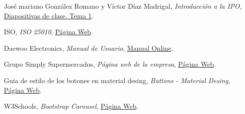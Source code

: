 \documentclass[a4paper,11pt]{article}
\begin{document}
\begin{thebibliography}{99}
  José mariano González Romano y Víctor Díaz Madrigal,
  \textit{Introducción a la IPO},
  \href{https://s3-eu-central-1.amazonaws.com/learn-eu-central-1-prod-fleet01-xythos/5ac734ed505df/1497177?response-content-disposition=inline%3B%20filename%2A%3DUTF-8%27%27IPO-2018-19-01-Introducci%25C3%25B3n%2520a%2520la%2520IPO.pdf&response-content-type=application%2Fpdf&X-Amz-Algorithm=AWS4-HMAC-SHA256&X-Amz-Date=20181009T201303Z&X-Amz-SignedHeaders=host&X-Amz-Expires=21600&X-Amz-Credential=AKIAIZ3QX2YUHH4EOO3A%2F20181009%2Feu-central-1%2Fs3%2Faws4_request&X-Amz-Signature=91e59768c9f86b77180953691bdcae19f7300073d4ad74d0949de1515d0b6f55}{Diapositivas de clase. Tema 1}.

ISO,
\textit{ISO 25010},
\href{https://iso25000.com/index.php/normas-iso-25000/iso-25010/23-usabilidad}{Página Web}.

Daewoo Electronics,
\textit{Manual de Usuario},
\href{http://www.daewooelectronics.co.uk/media/manual/KOG-6F2B_Manual.pdf}{Manual Online}.

Grupo Simply Supermercados,
\textit{Página web de la empresa},
\href{www.simply.es}{Página Web}.

Guia de estilo de los botones en material desing,
\textit{Buttons - Material Desing},
\href{https://material.io/design/components/buttons.html}{Página Web}.

W3Schools,
\textit{Bootstrap Carousel},
\href{https://www.w3schools.com/bootstrap/bootstrap_carousel.asp}{Página Web}.

\end{thebibliography}
\end{document}
